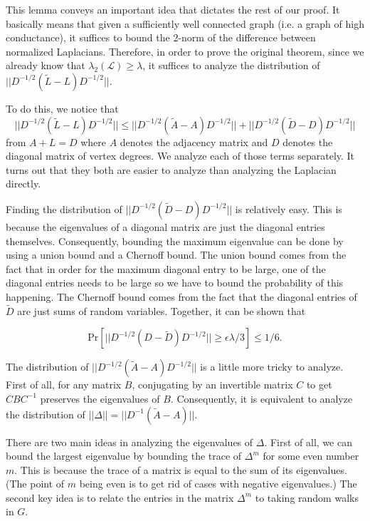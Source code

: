 \documentclass[12pt,twoside]{article}
\begin{document}
This lemma conveys an important idea that dictates the rest of our proof. It basically means that given a sufficiently well connected graph (i.e. a graph of high conductance), it suffices to bound the 2-norm of the difference between normalized Laplacians. Therefore, in order to prove the original theorem, since we already know that $\lambda_2(\mathcal{L}) \geq \lambda$, it suffices to analyze the distribution of $||D^{-1/2}(\tilde{L} - L)D^{-1/2}||$. 

To do this, we notice that 
%
\begin{equation}
||D^{-1/2}(\tilde{L} - L)D^{-1/2}|| \leq ||D^{-1/2}(\tilde{A} - A)D^{-1/2}|| + ||D^{-1/2}(\tilde{D} - D)D^{-1/2}||
\end{equation}
%
from $A + L = D$ where $A$ denotes the adjacency matrix and $D$ denotes the diagonal matrix of vertex degrees. We analyze each of those terms separately. It turns out that they both are easier to analyze than analyzing the Laplacian directly.

Finding the distribution of $||D^{-1/2}(\tilde{D} - D)D^{-1/2}||$ is relatively easy. This is because the eigenvalues of a diagonal matrix are just the diagonal entries themselves. Consequently, bounding the maximum eigenvalue can be done by using a union bound and a Chernoff bound. The union bound comes from the fact that in order for the maximum diagonal entry to be large, one of the diagonal entries needs to be large so we have to bound the probability of this happening. The Chernoff bound comes from the fact that the diagonal entries of $\tilde{D}$ are just sums of random variables. Together, it can be shown that

\begin{equation}
\text{Pr}[||D^{-1/2}(D - \tilde{D})D^{-1/2}|| \geq \epsilon\lambda/3] \leq 1/6.
\end{equation}

The distribution of $||D^{-1/2}(\tilde{A} - A)D^{-1/2}||$ is a little more tricky to analyze. First of all, for any matrix $B$, conjugating by an invertible matrix $C$ to get $CBC^{-1}$ preserves the eigenvalues of $B$. Consequently, it is equivalent to analyze the distribution of $||\Delta|| = ||D^{-1}(\tilde{A} - A)||$.  

There are two main ideas in analyzing the eigenvalues of $\Delta$. First of all, we can bound the largest eigenvalue by bounding the trace of $\Delta^m$ for some even number $m$. This is because the trace of a matrix is equal to the sum of its eigenvalues. (The point of $m$ being even is to get rid of cases with negative eigenvalues.) The second key idea is to relate the entries in the matrix $\Delta^m$ to taking random walks in $G$. 
\end{document}
